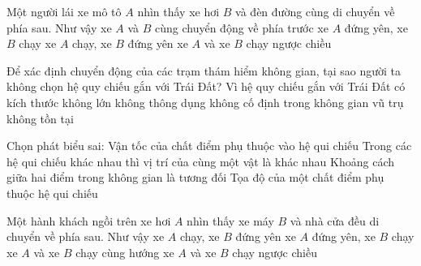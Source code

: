\begin{ex}
Một người lái xe mô tô $A$ nhìn thấy xe hơi $B$ và đèn đường cùng di chuyển về phía sau. Như vậy
\choice
{xe $A$ và $B$ cùng chuyển động về phía trước}
{xe $A$ đứng yên, xe $B$ chạy}
{\True xe $A$ chạy, xe $B$ đứng yên}
{xe $A$ và xe $B$ chạy ngược chiều}
\end{ex}

\begin{ex}
Để xác định chuyển động của các trạm thám hiểm không gian, tại sao người ta không chọn hệ quy chiếu gắn với Trái Đất? Vì hệ quy chiếu gắn với Trái Đất
\choice
{có kích thước không lớn}
{không thông dụng}
{\True không cố định trong không gian vũ trụ}
{không tồn tại}
\end{ex}

\begin{ex}
Chọn phát biểu sai:
\choice
{Vận tốc của chất điểm phụ thuộc vào hệ qui chiếu}
{Trong các hệ qui chiếu khác nhau thì vị trí của cùng một vật là khác nhau}
{\True Khoảng cách giữa hai điểm trong không gian là tương đối}
{Tọa độ của một chất điểm phụ thuộc hệ qui chiếu}
\end{ex}

\begin{ex}
Một hành khách ngồi trên xe hơi $A$ nhìn thấy xe máy $B$ và nhà cửa đều di chuyển về phía sau. Như vậy
\choice
{\True xe $A$ chạy, xe $B$ đứng yên}
{xe $A$ đứng yên, xe $B$ chạy}
{xe $A$ và xe $B$ chạy cùng hướng}
{xe $A$ và xe $B$ chạy ngược chiều}
\end{ex}

